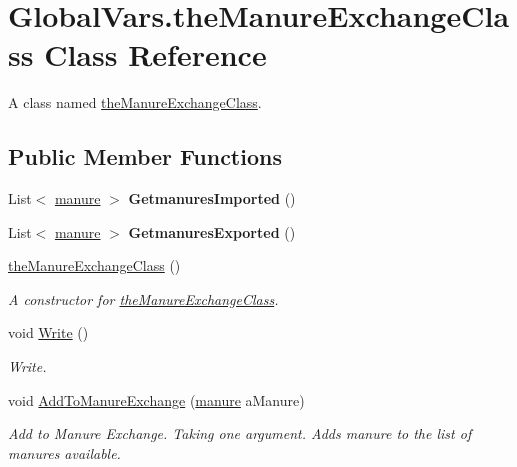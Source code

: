 \hypertarget{class_global_vars_1_1the_manure_exchange_class}{}\section{Global\+Vars.\+the\+Manure\+Exchange\+Class Class Reference}
\label{class_global_vars_1_1the_manure_exchange_class}


A class named \mbox{\hyperlink{class_global_vars_1_1the_manure_exchange_class}{the\+Manure\+Exchange\+Class}}.  


\subsection*{Public Member Functions}
\begin{DoxyCompactItemize}
\item 
\mbox{\label{class_global_vars_1_1the_manure_exchange_class_aa35f94ee25e0788755da61d187f32c25}} 
List$<$ \mbox{\hyperlink{classmanure}{manure}} $>$ {\bfseries Getmanures\+Imported} ()
\item 
\mbox{\label{class_global_vars_1_1the_manure_exchange_class_a2525db95b29f8b0ed3ea31be425245ee}} 
List$<$ \mbox{\hyperlink{classmanure}{manure}} $>$ {\bfseries Getmanures\+Exported} ()
\item 
\mbox{\hyperlink{class_global_vars_1_1the_manure_exchange_class_a81c638e25498afce3347dcb34bf1744a}{the\+Manure\+Exchange\+Class}} ()
\begin{DoxyCompactList}\small\item\em A constructor for \mbox{\hyperlink{class_global_vars_1_1the_manure_exchange_class}{the\+Manure\+Exchange\+Class}}. \end{DoxyCompactList}\item 
void \mbox{\hyperlink{class_global_vars_1_1the_manure_exchange_class_a8e150f91a33d2d0a723b2d1646087da1}{Write}} ()
\begin{DoxyCompactList}\small\item\em Write. \end{DoxyCompactList}\item 
void \mbox{\hyperlink{class_global_vars_1_1the_manure_exchange_class_aa73016736e7fb5158a6317c9e0e8304f}{Add\+To\+Manure\+Exchange}} (\mbox{\hyperlink{classmanure}{manure}} a\+Manure)
\begin{DoxyCompactList}\small\item\em Add to Manure Exchange. Taking one argument. Adds manure to the list of manures available. \end{DoxyCompactList}\item 

\end{DoxyCompactItemize}
